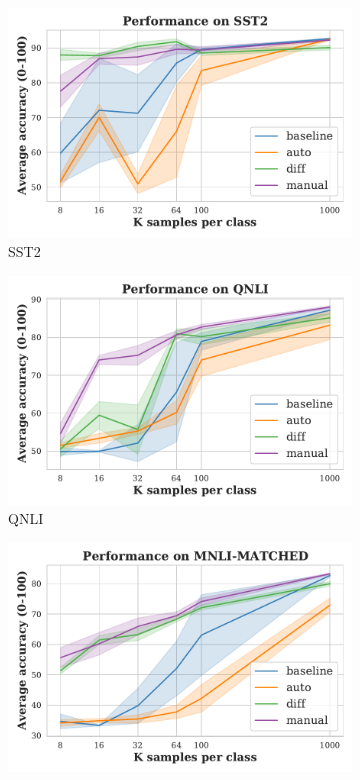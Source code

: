 \begin{figure}[!ht]
\begin{subfigure}{.33\textwidth}
  \centering
  \includegraphics[width=\linewidth]{figures/evaluation_media/SST2_prompting_performance.pdf}
  \caption{SST2}
  \label{fig:sst}
\end{subfigure}%
\begin{subfigure}{.33\textwidth}
  \centering
  \includegraphics[width=\linewidth]{figures/evaluation_media/QNLI_prompting_performance.pdf}
  \caption{QNLI}
  \label{fig:qnli}
\end{subfigure}
\begin{subfigure}{.33\textwidth}
  \centering
  \includegraphics[width=\linewidth]{figures/evaluation_media/MNLI-MATCHED_prompting_performance.pdf}

\end{subfigure}
\end{figure}

